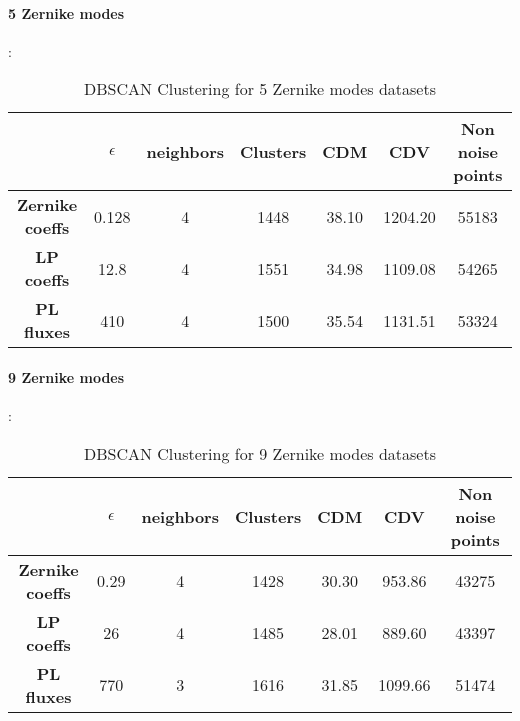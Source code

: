 		\paragraph{5 Zernike modes}:
		\begin{table}[h!]
			\centering
			\begin{tabular}{|c|c|c|c|c|c|c|}
				\hline
				\textbf{} & \textbf{$\epsilon$} & \textbf{neighbors} & \textbf{Clusters} & \textbf{CDM} & \textbf{CDV} & \textbf{Non noise points}\\
				\hline
				\textbf{Zernike coeffs} & 0.128 & 4 & 1448 & 38.10 & 1204.20 & 55183 \\
				\hline
				\textbf{LP coeffs} & 12.8 & 4 & 1551 & 34.98 & 1109.08 & 54265 \\
				\hline
				\textbf{PL fluxes} & 410 & 4 & 1500 & 35.54 & 1131.51 & 53324 \\
				\hline
			\end{tabular}
		\caption{DBSCAN Clustering for 5 Zernike modes datasets}
		\end{table}
		\FloatBarrier
		
		\paragraph{9 Zernike modes}:
		\begin{table}[h!]
			\centering
			\begin{tabular}{|c|c|c|c|c|c|c|}
				\hline
				\textbf{} & \textbf{$\epsilon$} & \textbf{neighbors} & \textbf{Clusters} & \textbf{CDM} & \textbf{CDV} & \textbf{Non noise points}\\
				\hline
				\textbf{Zernike coeffs} & 0.29 & 4 & 1428 & 30.30 & 953.86 & 43275 \\
				\hline
				\textbf{LP coeffs} & 26 & 4 & 1485 & 28.01 & 889.60 & 43397 \\
				\hline
				\textbf{PL fluxes} & 770 & 3 & 1616 & 31.85 & 1099.66 & 51474 \\
				\hline
			\end{tabular}
		\caption{DBSCAN Clustering for 9 Zernike modes datasets}
		\end{table}
		\FloatBarrier
		
